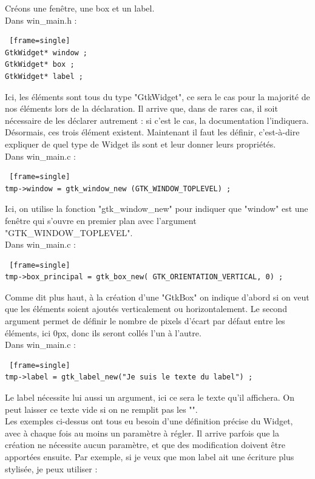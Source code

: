 \documentclass[11pt,french,a4paper]{report}
\begin{document}
Créons une fenêtre, une box et un label.\\
\small Dans win\_main.h : \normalsize
\begin{lstlisting} [frame=single]
GtkWidget* window ; 
GtkWidget* box ;   
GtkWidget* label ;  
\end{lstlisting}
Ici, les éléments sont tous du type "GtkWidget", ce sera le cas pour la majorité de nos éléments lors de la 
déclaration.
Il arrive que, dans de rares cas, il soit nécessaire de les déclarer autrement : si c'est le cas, la documentation l'indiquera. \\ 
Désormais, ces trois élément existent. Maintenant il faut les définir, c'est-à-dire expliquer de quel type de Widget ils sont 
et leur donner leurs propriétés. \\
\small Dans win\_main.c : \normalsize
\begin{lstlisting} [frame=single]
tmp->window = gtk_window_new (GTK_WINDOW_TOPLEVEL) ;
\end{lstlisting}
Ici, on utilise la fonction "gtk\_window\_new" pour indiquer que "window" est une fenêtre qui s'ouvre en premier plan 
avec l'argument "GTK\_WINDOW\_TOPLEVEL". \\
\small Dans win\_main.c : \normalsize
\begin{lstlisting} [frame=single]
tmp->box_principal = gtk_box_new( GTK_ORIENTATION_VERTICAL, 0) ;
\end{lstlisting}
Comme dit plus haut, à la création d'une "GtkBox" on indique d'abord si on veut que les éléments soient ajoutés verticalement 
ou horizontalement. Le second argument permet de définir le nombre de pixels d'écart par défaut entre les éléments, 
ici 0px, donc ils seront collés l'un à l'autre.  \\
\small Dans win\_main.c : \normalsize
\begin{lstlisting} [frame=single]
tmp->label = gtk_label_new("Je suis le texte du label") ; 
\end{lstlisting}
Le label nécessite lui aussi un argument, ici ce sera le texte qu'il affichera. 
On peut laisser ce texte vide si on ne remplit pas les "".  \\
Les exemples ci-dessus ont tous eu besoin d'une définition précise du Widget, avec à chaque fois au moins un paramètre à régler. 
Il arrive parfois que la création ne nécessite aucun paramètre, et que des modification doivent être apportées ensuite. 
Par exemple, si je veux que mon label ait une écriture plus stylisée, je peux utiliser :  \\
\end{document}
